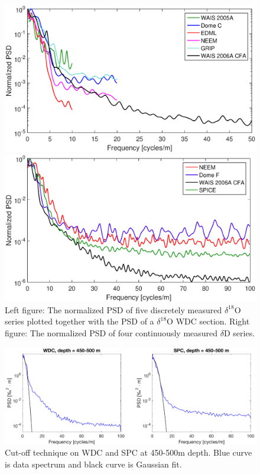 \documentclass[draft, jgrga]{AGUTeX}
\begin{document}

\newpage

\begin{figure}[]
	\centering
	\begin{minipage}{.5\textwidth}
		\centering
		\includegraphics[width=0.9\linewidth]{PSD_discrete_plus_cfa_v1.eps}

	\end{minipage}%
	\begin{minipage}{0.5\textwidth}
		\centering
		\indent\includegraphics[width=0.9\linewidth]{PSD_CFA_v1.eps}

	\end{minipage}
	\caption{Left figure: The normalized PSD of five discretely measured $\delta^{18}$O series plotted together with the PSD of a $\delta^{18}$O WDC section. Right figure: The normalized PSD of four continuously measured $\delta$D series.} 
\label{spectra_disVScfa}
\end{figure}

\begin{figure}
	\includegraphics[width=\linewidth]{cutoff.eps}
	\caption{Cut-off technique on WDC and SPC at 450-500m depth. Blue curve is data spectrum and black curve is Gaussian fit.} \label{cutoff}
\end{figure}
\end{document}
